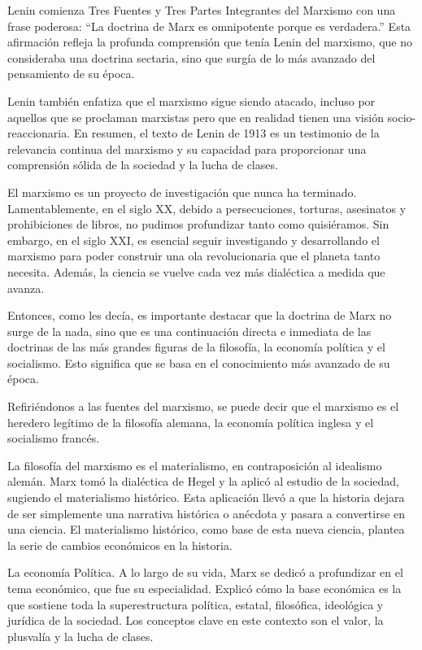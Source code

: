 \documentclass[
  jou,
  floatsintext,
  longtable,
  a4paper,
  nolmodern,
  notxfonts,
  notimes,
  12pt,
  colorlinks=true,linkcolor=blue,citecolor=blue,urlcolor=blue]{apa7}
\begin{document}
Lenin comienza Tres Fuentes y Tres Partes Integrantes del Marxismo con
una frase poderosa: ``La doctrina de Marx es omnipotente porque es
verdadera.'' Esta afirmación refleja la profunda comprensión que tenía
Lenin del marxismo, que no consideraba una doctrina sectaria, sino que
surgía de lo más avanzado del pensamiento de su época.

Lenin también enfatiza que el marxismo sigue siendo atacado, incluso por
aquellos que se proclaman marxistas pero que en realidad tienen una
visión socio-reaccionaria. En resumen, el texto de Lenin de 1913 es un
testimonio de la relevancia continua del marxismo y su capacidad para
proporcionar una comprensión sólida de la sociedad y la lucha de clases.

El marxismo es un proyecto de investigación que nunca ha terminado.
Lamentablemente, en el siglo XX, debido a persecuciones, torturas,
asesinatos y prohibiciones de libros, no pudimos profundizar tanto como
quisiéramos. Sin embargo, en el siglo XXI, es esencial seguir
investigando y desarrollando el marxismo para poder construir una ola
revolucionaria que el planeta tanto necesita. Además, la ciencia se
vuelve cada vez más dialéctica a medida que avanza.

Entonces, como les decía, es importante destacar que la doctrina de Marx
no surge de la nada, sino que es una continuación directa e inmediata de
las doctrinas de las más grandes figuras de la filosofía, la economía
política y el socialismo. Esto significa que se basa en el conocimiento
más avanzado de su época.

Refiriéndonos a las fuentes del marxismo, se puede decir que el marxismo
es el heredero legítimo de la filosofía alemana, la economía política
inglesa y el socialismo francés.

La filosofía del marxismo es el materialismo, en contraposición al
idealismo alemán. Marx tomó la dialéctica de Hegel y la aplicó al
estudio de la sociedad, sugiendo el materialismo histórico. Esta
aplicación llevó a que la historia dejara de ser simplemente una
narrativa histórica o anécdota y pasara a convertirse en una ciencia. El
materialismo histórico, como base de esta nueva ciencia, plantea la
serie de cambios económicos en la historia.

La economía Política. A lo largo de su vida, Marx se dedicó a
profundizar en el tema económico, que fue su especialidad. Explicó cómo
la base económica es la que sostiene toda la superestructura política,
estatal, filosófica, ideológica y jurídica de la sociedad. Los conceptos
clave en este contexto son el valor, la plusvalía y la lucha de clases.
\end{document}

